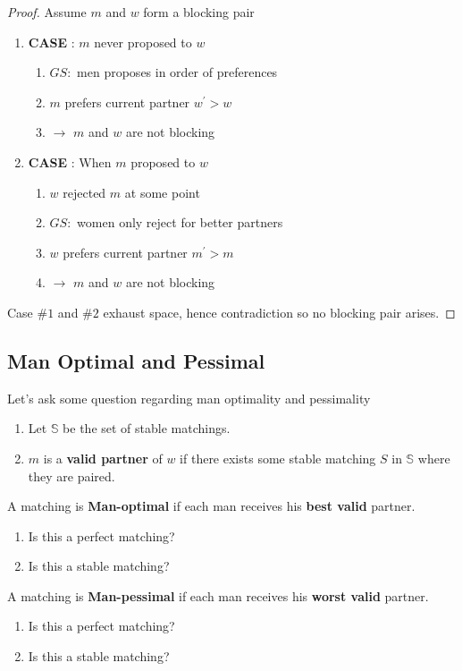 \begin{proof}
    Assume $m$ and $w$ form a blocking pair
\begin{enumerate}
    \item \textbf{CASE} : $m$ never proposed to $w$
    \begin{enumerate}
        \item $GS:$ men proposes in order of preferences
        \item $m$ prefers current partner $w^\prime > w$
        \item $\longrightarrow$ $m$ and $w$ are not blocking
    \end{enumerate}
       
    \item \textbf{CASE} : When $m$ proposed to $w$
    \begin{enumerate}
        \item $w$ rejected $m$ at some point
        \item $GS:$ women only reject for better partners
        \item $w$ prefers current partner $m^\prime > m$
        \item $\longrightarrow$ $m$ and $w$ are not blocking
    \end{enumerate}
\end{enumerate}
Case $\#1$ and $\#2$ exhaust space, hence contradiction so no blocking pair arises.
\end{proof}

\subsection{Man Optimal and Pessimal}
Let's ask some question regarding man optimality and pessimality
    \begin{enumerate}
        \item Let $\mathbb{S}$ be the set of stable matchings.
        \item $m$ is a \textbf{valid partner} of $w$ if there exists some stable matching $S$ in $\mathbb{S}$ where they are paired.
    \end{enumerate}
A matching is \textbf{Man-optimal} if each man receives his \textbf{best valid} partner.
    \begin{enumerate}
        \item Is this a perfect matching?
        \item Is this a stable matching?
    \end{enumerate}
A matching is \textbf{Man-pessimal} if each man receives his \textbf{worst valid} partner.
    \begin{enumerate}
        \item Is this a perfect matching?
        \item Is this a stable matching?
    \end{enumerate}

